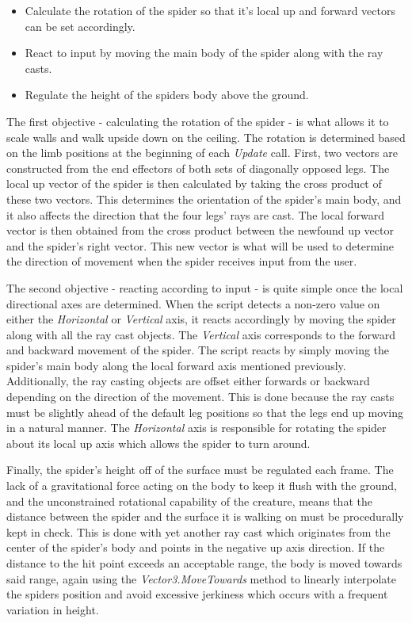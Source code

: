 \begin{itemize}

    \item Calculate the rotation of the spider so that it's local up and forward
        vectors can be set accordingly.

    \item React to input by moving the main body of the spider along with the
        ray casts.

    \item Regulate the height of the spiders body above the ground.

\end{itemize}

The first objective - calculating the rotation of the spider - is what allows it
to scale walls and walk upside down on the ceiling. The rotation is determined
based on the limb positions at the beginning of each \textit{Update} call.
First, two vectors are constructed from the end effectors of both sets of
diagonally opposed legs. The local up vector of the spider is then calculated by
taking the cross product of these two vectors. This determines the orientation
of the spider's main body, and it also affects the direction that the four legs'
rays are cast. The local forward vector is then obtained from the cross product
between the newfound up vector and the spider's right vector. This new vector is
what will be used to determine the direction of movement when the spider
receives input from the user.

The second objective - reacting according to input - is quite simple once the
local directional axes are determined. When the script detects a non-zero value
on either the \textit{Horizontal} or \textit{Vertical} axis, it reacts
accordingly by moving the spider along with all the ray cast objects. The
\textit{Vertical} axis corresponds to the forward and backward movement of the
spider. The script reacts by simply moving the spider's main body along the
local forward axis mentioned previously. Additionally, the ray casting objects
are offset either forwards or backward depending on the direction of the
movement. This is done because the ray casts must be slightly ahead of the
default leg positions so that the legs end up moving in a natural manner.
The \textit{Horizontal} axis is responsible for rotating the spider about its
local up axis which allows the spider to turn around. 

Finally, the spider's height off of the surface must be regulated each frame.
The lack of a gravitational force acting on the body to keep it flush with the
ground, and the unconstrained rotational capability of the creature, means that
the distance between the spider and the surface it is walking on must be
procedurally kept in check. This is done with yet another ray cast which
originates from the center of the spider's body and points in the negative up
axis direction. If the distance to the hit point exceeds an acceptable range,
the body is moved towards said range, again using the
\textit{Vector3.MoveTowards} method to linearly interpolate the spiders position
and avoid excessive jerkiness which occurs with a frequent variation in height. 



